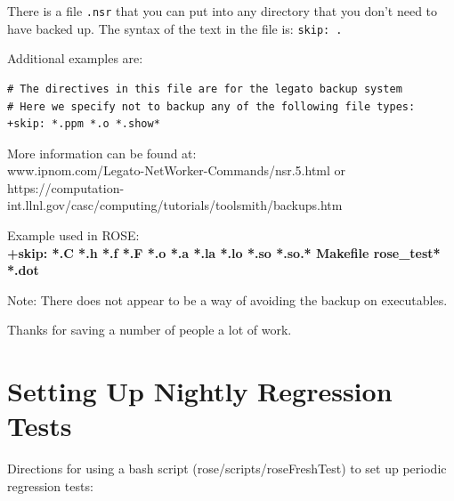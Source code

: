    There is a file {\tt .nsr} that you can put into
any directory that you don't need to have backed up.
The syntax of the text in the file is:
{\tt skip: .}

Additional examples are:
\begin{verbatim}
# The directives in this file are for the legato backup system
# Here we specify not to backup any of the following file types:
+skip: *.ppm *.o *.show*
\end{verbatim}

More information can be found at: \\
   www.ipnom.com/Legato-NetWorker-Commands/nsr.5.html
or \\
   https://computation-int.llnl.gov/casc/computing/tutorials/toolsmith/backups.htm

Example used in ROSE: \\
{\bf +skip: *.C *.h *.f *.F *.o *.a *.la *.lo *.so *.so.* Makefile rose\_test* *.dot}

Note: There does not appear to be a way of avoiding the backup on executables.

Thanks for saving a number of people a lot of work.



\section{Setting Up Nightly Regression Tests}%

Directions for using a bash script (rose/scripts/roseFreshTest) to set up periodic regression tests:

